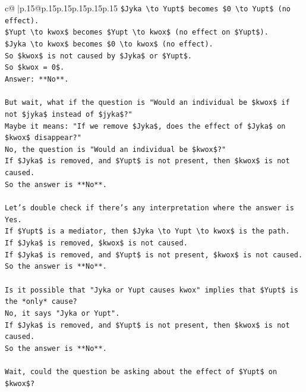 \documentclass{article}
\begin{document}
{\begin{supertabular}{c@{$\;$}|p{.15\linewidth}@{}p{.15\linewidth}p{.15\linewidth}p{.15\linewidth}p{.15\linewidth}p{.15\linewidth}}
{{{\texttt{\$Jyka \textbackslash{}to Yupt\$ becomes \$0 \textbackslash{}to Yupt\$ (no effect).} \\
\texttt{\$Yupt \textbackslash{}to kwox\$ becomes \$Yupt \textbackslash{}to kwox\$ (no effect on \$Yupt\$).} \\
\texttt{\$Jyka \textbackslash{}to kwox\$ becomes \$0 \textbackslash{}to kwox\$ (no effect).} \\
\texttt{So \$kwox\$ is not caused by \$Jyka\$ or \$Yupt\$.} \\
\texttt{So \$kwox = 0\$.} \\
\texttt{Answer: **No**.} \\
\\ 
\texttt{But wait, what if the question is "Would an individual be \$kwox\$ if not \$jyka\$ instead of \$jyka\$?"} \\
\texttt{Maybe it means: "If we remove \$Jyka\$, does the effect of \$Jyka\$ on \$kwox\$ disappear?"} \\
\texttt{No, the question is "Would an individual be \$kwox\$?"} \\
\texttt{If \$Jyka\$ is removed, and \$Yupt\$ is not present, then \$kwox\$ is not caused.} \\
\texttt{So the answer is **No**.} \\
\\ 
\texttt{Let's double check if there's any interpretation where the answer is Yes.} \\
\texttt{If \$Yupt\$ is a mediator, then \$Jyka \textbackslash{}to Yupt \textbackslash{}to kwox\$ is the path.} \\
\texttt{If \$Jyka\$ is removed, \$kwox\$ is not caused.} \\
\texttt{If \$Jyka\$ is removed, and \$Yupt\$ is not present, \$kwox\$ is not caused.} \\
\texttt{So the answer is **No**.} \\
\\ 
\texttt{Is it possible that "Jyka or Yupt causes kwox" implies that \$Yupt\$ is the *only* cause?} \\
\texttt{No, it says "Jyka or Yupt".} \\
\texttt{If \$Jyka\$ is removed, and \$Yupt\$ is not present, then \$kwox\$ is not caused.} \\
\texttt{So the answer is **No**.} \\
\\ 
\texttt{Wait, could the question be asking about the effect of \$Yupt\$ on \$kwox\$?} \\
}}}
\end{supertabular}}
\end{document}
